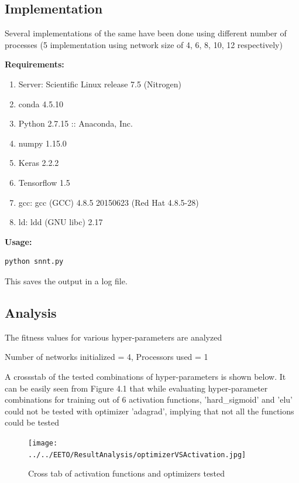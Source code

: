 \subsection{Implementation}

Several implementations of the same have been done using different number of processes (5 implementation using network size of 4, 6, 8, 10, 12 respectively)

\textbf{Requirements:}
\begin{enumerate}
	\def\labelenumi{\arabic{enumi}.}
	\item
	Server: Scientific Linux release 7.5 (Nitrogen)
	\item
	conda 4.5.10
	\item
	Python 2.7.15 :: Anaconda, Inc.
	\item
	numpy 1.15.0
	\item
	Keras 2.2.2
	\item
	Tensorflow 1.5
	\item
	gcc: gcc (GCC) 4.8.5 20150623 (Red Hat 4.8.5-28)
	\item
	ld: ldd (GNU libc) 2.17
\end{enumerate}

\textbf{Usage:}

\begin{verbatim}
python snnt.py
\end{verbatim}

This saves the output in a log file.

\subsection{Analysis}

The fitness values for various hyper-parameters are analyzed

Number of networks initialized = 4, Processors used = 1

A crossstab of the tested combinations of hyper-parameters is
shown below. It can be easily seen from Figure 4.1 that while evaluating hyper-parameter
combinations for training out of 6 activation functions, 'hard\_sigmoid'
and 'elu' could not be tested with optimizer 'adagrad', implying that not all the functions could be tested

\begin{figure}
	 \texttt{[image: ../../EETO/ResultAnalysis/optimizerVSActivation.jpg]}
	 \caption{Cross tab of activation functions and optimizers tested }
\end{figure}

